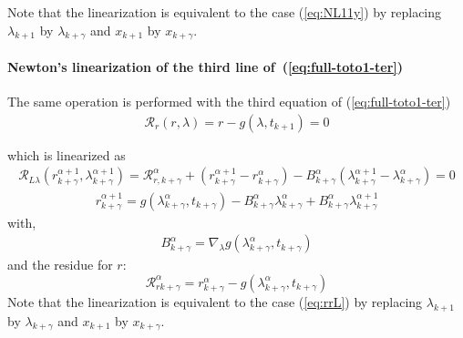 Note that the linearization is equivalent to the case (\ref{eq:NL11y}) by replacing $\lambda_{k+1}$ by $\lambda_{k+\gamma}$ and $x_{k+1}$ by $x_{k+\gamma}$.

 \paragraph{Newton's linearization of the third  line of~(\ref{eq:full-toto1-ter})}
The same operation is performed with the third equation of (\ref{eq:full-toto1-ter})
\begin{equation}
  \begin{array}{l}
    \mathcal R_r(r,\lambda)=r-g(\lambda,t_{k+1}) =0\\ \\  \end{array}
\end{equation}
which is linearized as
\begin{equation}
  \label{eq:full-NL9}
  \begin{array}{l}
      \mathcal R_{L\lambda}(r^{\alpha+1}_{k+\gamma},\lambda^{\alpha+1}_{k+\gamma}) = \mathcal
      R_{r,k+\gamma}^{\alpha} + (r^{\alpha+1}_{k+\gamma} - r^{\alpha}_{k+\gamma}) - B^{\alpha}_{k+\gamma}(\lambda^{\alpha+1}_{k+\gamma} -
      \lambda^{\alpha}_{k+\gamma})=0
    \end{array}
  \end{equation}
\begin{equation}
  \label{eq:full-rrL}
  \begin{array}{l}
    \boxed{r^{\alpha+1}_{k+\gamma} = g(\lambda ^{\alpha}_{k+\gamma},t_{k+\gamma}) -B^{\alpha}_{k+\gamma}
      \lambda^{\alpha}_{k+\gamma} + B^{\alpha}_{k+\gamma} \lambda^{\alpha+1}_{k+\gamma}}
  \end{array}
\end{equation}
with,
\begin{equation}
     \begin{array}{l}
  B^{\alpha}_{k+\gamma} = \nabla_{\lambda}g(\lambda ^{\alpha}_{k+\gamma},t_{k+\gamma})
 \end{array}
\end{equation}
and the  residue for $r$:
\begin{equation}
\boxed{\mathcal
      R_{rk+\gamma}^{\alpha} = r^{\alpha}_{k+\gamma} - g(\lambda ^{\alpha}_{k+\gamma},t_{k+\gamma})}
  \end{equation}
Note that the linearization is equivalent to the case (\ref{eq:rrL}) by replacing $\lambda_{k+1}$ by $\lambda_{k+\gamma}$ and $x_{k+1}$ by $x_{k+\gamma}$.

